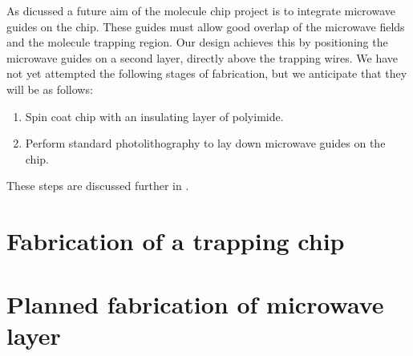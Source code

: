 As dicussed  a future aim of the molecule chip project is to
integrate microwave guides on the chip. These guides must allow good overlap of
the microwave fields and the molecule trapping region. Our design achieves this
by positioning the microwave guides on a second layer, directly above the
trapping wires.  We have not yet attempted the following stages of
fabrication, but we anticipate that they will be as follows:
\begin{enumerate}[resume]
    \item Spin coat chip with an insulating layer of polyimide.
    \item Perform standard photolithography to lay down microwave guides on the
      chip.
\end{enumerate}
These steps are discussed further in .

\section{Fabrication of a trapping chip}

\section{Planned fabrication of microwave layer}

